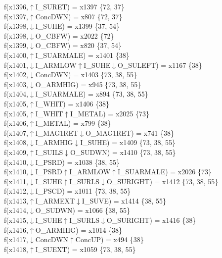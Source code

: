 f(x1396,$\uparrow$I\_SURET) = x1397 \{72, 37\} \\  
f(x1397,$\uparrow$ConcDWN) = x807 \{72, 37\} \\  
f(x1398,$\downarrow$I\_SUHE) = x1399 \{37, 54\} \\  
f(x1398,$\downarrow$O\_CBFW) = x2022 \{72\} \\  
f(x1399,$\downarrow$O\_CBFW) = x820 \{37, 54\} \\  
f(x1400,$\uparrow$I\_SUARMALE) = x1401 \{38\} \\  
f(x1401,$\downarrow$I\_ARMLOW$\uparrow$I\_SUHE$\downarrow$O\_SULEFT) = x1167 \{38\} \\  
f(x1402,$\downarrow$ConcDWN) = x1403 \{73, 38, 55\} \\  
f(x1403,$\downarrow$O\_ARMHIG) = x945 \{73, 38, 55\} \\  
f(x1404,$\downarrow$I\_SUARMALE) = x894 \{73, 38, 55\} \\  
f(x1405,$\uparrow$I\_WHIT) = x1406 \{38\} \\  
f(x1405,$\uparrow$I\_WHIT$\uparrow$I\_METAL) = x2025 \{73\} \\  
f(x1406,$\uparrow$I\_METAL) = x799 \{38\} \\  
f(x1407,$\uparrow$I\_MAG1RET$\downarrow$O\_MAG1RET) = x741 \{38\} \\  
f(x1408,$\downarrow$I\_ARMHIG$\downarrow$I\_SUHE) = x1409 \{73, 38, 55\} \\  
f(x1409,$\uparrow$I\_SUILS$\downarrow$O\_SUDWN) = x1410 \{73, 38, 55\} \\  
f(x1410,$\downarrow$I\_PSRD) = x1038 \{38, 55\} \\  
f(x1410,$\downarrow$I\_PSRD$\uparrow$I\_ARMLOW$\uparrow$I\_SUARMALE) = x2026 \{73\} \\  
f(x1411,$\downarrow$I\_SUHE$\uparrow$I\_SURLS$\downarrow$O\_SURIGHT) = x1412 \{73, 38, 55\} \\  
f(x1412,$\downarrow$I\_PSCD) = x1011 \{73, 38, 55\} \\  
f(x1413,$\uparrow$I\_ARMEXT$\downarrow$I\_SUVE) = x1414 \{38, 55\} \\  
f(x1414,$\downarrow$O\_SUDWN) = x1066 \{38, 55\} \\  
f(x1415,$\downarrow$I\_SUHE$\uparrow$I\_SURLS$\downarrow$O\_SURIGHT) = x1416 \{38\} \\  
f(x1416,$\uparrow$O\_ARMHIG) = x1014 \{38\} \\  
f(x1417,$\downarrow$ConcDWN$\uparrow$ConcUP) = x494 \{38\} \\  
f(x1418,$\uparrow$I\_SUEXT) = x1059 \{73, 38, 55\} \\  
